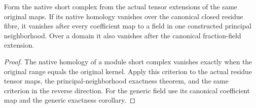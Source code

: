 \begin{corollary}
\label{cor:kn-specialization-original-free-native-homology}
\leanok
{}
Form the native short complex from the actual tensor extensions of the
same original maps.  If its native homology vanishes over the canonical
closed residue fibre, it vanishes after every coefficient map to a
field in one constructed principal neighborhood.  Over a domain it
also vanishes after the canonical fraction-field extension.
\end{corollary}
\begin{proof}
The native homology of a module short complex vanishes exactly when
the original range equals the original kernel.  Apply this criterion
to the actual residue tensor maps, the principal-neighborhood
exactness theorem, and the same criterion in the reverse direction.
For the generic field use its canonical coefficient map and the
generic exactness corollary.
\end{proof}
